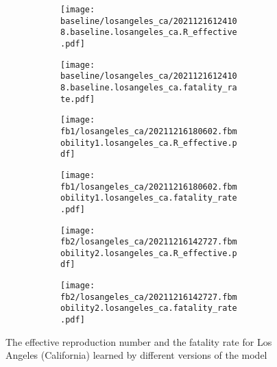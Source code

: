 \begin{figure}[!htb]
    \centering

    \begin{subfigure}[b]{\linewidth}
        \centering
        \begin{subfigure}[b]{0.4\linewidth}
            \texttt{[image: baseline/losangeles\_ca/20211216124108.baseline.losangeles\_ca.R\_effective.pdf]}
        \end{subfigure}
        \begin{subfigure}[b]{0.4\linewidth}
            \texttt{[image: baseline/losangeles\_ca/20211216124108.baseline.losangeles\_ca.fatality\_rate.pdf]}
        \end{subfigure}
    \end{subfigure}

    \begin{subfigure}[b]{\linewidth}
        \centering
        \begin{subfigure}[b]{0.4\linewidth}
            \texttt{[image: fb1/losangeles\_ca/20211216180602.fbmobility1.losangeles\_ca.R\_effective.pdf]}
        \end{subfigure}
        \begin{subfigure}[b]{0.4\linewidth}
            \texttt{[image: fb1/losangeles\_ca/20211216180602.fbmobility1.losangeles\_ca.fatality\_rate.pdf]}
        \end{subfigure}
    \end{subfigure}

    \begin{subfigure}[b]{\linewidth}
        \centering
        \begin{subfigure}[b]{0.4\linewidth}
            \texttt{[image: fb2/losangeles\_ca/20211216142727.fbmobility2.losangeles\_ca.R\_effective.pdf]}
        \end{subfigure}
        \begin{subfigure}[b]{0.4\linewidth}
            \texttt{[image: fb2/losangeles\_ca/20211216142727.fbmobility2.losangeles\_ca.fatality\_rate.pdf]}
        \end{subfigure}
    \end{subfigure}

    \caption{The effective reproduction number and the fatality rate for Los Angeles (California) learned by different versions of the model}
    \label{fig:R0-and-fatality-losangeles}
\end{figure}

